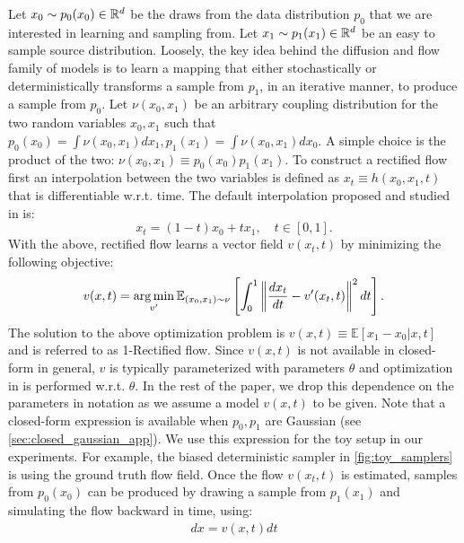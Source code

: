 Let $x_0 \sim p_0(x_0) \in \mathbb{R}^d$ be the draws from the data distribution $p_0$ that we are interested in learning and sampling from.
Let $x_1\sim p_1(x_1) \in \mathbb{R}^d$ be an easy to sample source distribution.
Loosely, the key idea behind the diffusion and flow family of models is to learn a mapping that either stochastically or deterministically transforms a sample from $p_1$, in an iterative manner, to produce a sample from $p_0$.
Let $\nu(x_0, x_1)$ be an arbitrary coupling distribution for the two random variables $x_0, x_1$ such that $p_0(x_0) = \int \nu(x_0, x_1)dx_1, p_1(x_1) = \int \nu(x_0, x_1)dx_0$.
A simple choice is the product of the two: $\nu(x_0, x_1) \equiv p_0(x_0)p_1(x_1)$.
To construct a rectified flow first an interpolation between the two variables is defined as $x_t \equiv h(x_0, x_1, t)$ that is differentiable w.r.t. time.
The default interpolation proposed and studied in \citet{liu2022flow} is:
\begin{equation}
\label{eq:rect_flow_default_interp}
x_t = (1-t)x_0 + t x_1, \quad t \in [0, 1].
\end{equation}
With the above, rectified flow learns a vector field $v(x_t, t)$ by minimizing the following objective:
\begin{equation}
\label{eq:rectflow_obj}
v(x, t) = \operatorname*{arg\,min}_{v'} \mathbb E_{(x_0, x_1)\sim \nu} \left[ \int_0^1 \left\lVert \frac{dx_t}{dt} - v'(x_t, t) \right\rVert^2 dt \right].
\end{equation}
The solution to the above optimization problem is $v(x, t) \equiv \mathbb E[x_1 - x_0 |x,t]$ and is referred to as 1-Rectified flow.
Since $v(x, t)$ is not available in closed-form in general, $v$ is typically parameterized with parameters $\theta$ and optimization in  is performed w.r.t. $\theta$.
In the rest of the paper, we drop this dependence on the parameters in notation as we assume a model $v(x, t)$ to be given.
Note that a closed-form expression is available when $p_0, p_1$ are Gaussian (see \cref{sec:closed_gaussian_app}).
We use this expression for the toy setup in our experiments. For example, the biased deterministic sampler in \cref{fig:toy_samplers} is using the ground truth flow field.
Once the flow $v(x_t, t)$ is estimated, samples from $p_0(x_0)$ can be produced by drawing a sample from $p_1(x_1)$ and simulating the flow backward in time, using:
\begin{align}
\label{eq:rect_flow_ode}
dx = v(x, t)dt
\end{align}

